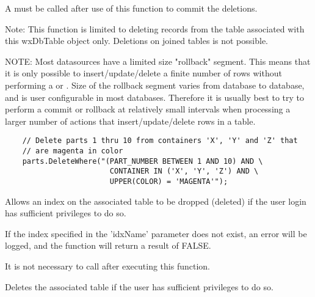 A  must be called after use of 
this function to commit the deletions.

Note: This function is limited to deleting records from the table associated 
with this wxDbTable object only.  Deletions on joined tables is not possible.

NOTE: Most datasources have a limited size "rollback" segment.  This means 
that it is only possible to insert/update/delete a finite number of rows 
without performing a  or 
.  Size of the rollback 
segment varies from database to database, and is user configurable in 
most databases.  Therefore it is usually best to try to perform a commit 
or rollback at relatively small intervals when processing a larger number 
of actions that insert/update/delete rows in a table.


\begin{verbatim}
    // Delete parts 1 thru 10 from containers 'X', 'Y' and 'Z' that 
    // are magenta in color
    parts.DeleteWhere("(PART_NUMBER BETWEEN 1 AND 10) AND \
                        CONTAINER IN ('X', 'Y', 'Z') AND \
                        UPPER(COLOR) = 'MAGENTA'");
\end{verbatim}


\label{wxdbtabledropindex}


Allows an index on the associated table to be dropped (deleted) if the user 
login has sufficient privileges to do so.




If the index specified in the 'idxName' parameter does not exist, an error 
will be logged, and the function will return a result of FALSE.

It is not necessary to call  
after executing this function.


\label{wxdbtabledroptable}


Deletes the associated table if the user has sufficient privileges to do so.

